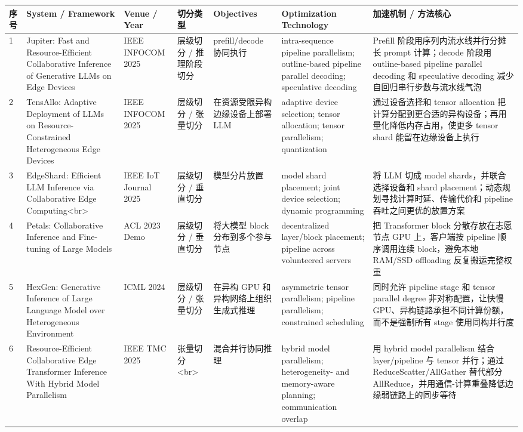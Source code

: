 \documentclass[a4paper,10pt]{ctexart}
\begin{document}
\begin{table}[H]
\centering
\scriptsize
\setlength{\tabcolsep}{3pt}
\renewcommand{\arraystretch}{1.15}
\begin{tabularx}{\textwidth}{|X|X|X|X|X|X|X|}
\hline
\textbf{序号} & \textbf{System / Framework} & \textbf{Venue / Year} & \textbf{切分类型} & \textbf{Objectives} & \textbf{Optimization Technology} & \textbf{加速机制 / 方法核心} \\ \hline
1 & Jupiter: Fast and Resource-Efficient Collaborative Inference of Generative LLMs on Edge Devices & IEEE INFOCOM 2025 & 层级切分 / 推理阶段切分 & prefill/decode 协同执行 & intra-sequence pipeline parallelism; outline-based pipeline parallel decoding; speculative decoding & Prefill 阶段用序列内流水线并行分摊长 prompt 计算；decode 阶段用 outline-based pipeline parallel decoding 和 speculative decoding 减少自回归串行步数与流水线气泡 \\ \hline
2 & TensAllo: Adaptive Deployment of LLMs on Resource-Constrained Heterogeneous Edge Devices & IEEE INFOCOM 2025 & 层级切分 / 张量切分 & 在资源受限异构边缘设备上部署 LLM & adaptive device selection; tensor allocation; tensor parallelism; quantization & 通过设备选择和 tensor allocation 把计算分配到更合适的异构设备；再用量化降低内存占用，使更多 tensor shard 能留在边缘设备上执行 \\ \hline
3 & EdgeShard: Efficient LLM Inference via Collaborative Edge Computing<br> & IEEE IoT Journal 2025 & 层级切分 / 垂直切分 & 模型分片放置 & model shard placement; joint device selection; dynamic programming & 将 LLM 切成 model shards，并联合选择设备和 shard placement；动态规划寻找计算时延、传输代价和 pipeline 吞吐之间更优的放置方案 \\ \hline
4 & Petals: Collaborative Inference and Fine-tuning of Large Models & ACL 2023 Demo & 层级切分 / 垂直切分 & 将大模型 block 分布到多个参与节点 & decentralized layer/block placement; pipeline across volunteered servers & 把 Transformer block 分散存放在志愿节点 GPU 上，客户端按 pipeline 顺序调用连续 block，避免本地 RAM/SSD offloading 反复搬运完整权重 \\ \hline
5 & HexGen: Generative Inference of Large Language Model over Heterogeneous Environment & ICML 2024 & 层级切分 / 张量切分 & 在异构 GPU 和异构网络上组织生成式推理 & asymmetric tensor parallelism; pipeline parallelism; constrained scheduling & 同时允许 pipeline stage 和 tensor parallel degree 非对称配置，让快慢 GPU、异构链路承担不同计算份额，而不是强制所有 stage 使用同构并行度 \\ \hline
6 & Resource-Efficient Collaborative Edge Transformer Inference With Hybrid Model Parallelism & IEEE TMC 2025 & 张量切分<br> & 混合并行协同推理 & hybrid model parallelism; heterogeneity- and memory-aware planning; communication overlap & 用 hybrid model parallelism 结合 layer/pipeline 与 tensor 并行；通过 ReduceScatter/AllGather 替代部分 AllReduce，并用通信-计算重叠降低边缘弱链路上的同步等待 \\ \hline

\end{tabularx}
\end{table}
\end{document}
